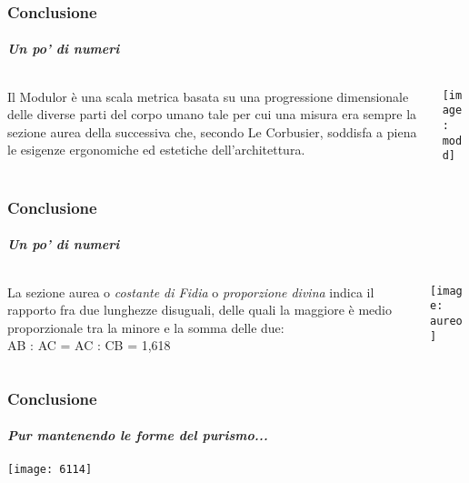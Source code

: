 \documentclass{beamer}
\begin{document}
\begin{frame}     

\frametitle{Conclusione}
\framesubtitle{\textit{Un po' di numeri}}

\begin{columns}
\begin{column}{0.4\textwidth}

Il Modulor è una scala metrica basata su una progressione dimensionale delle
diverse parti del corpo umano tale per cui una misura era sempre la sezione aurea della successiva che, secondo Le Corbusier, soddisfa a piena
le esigenze ergonomiche ed estetiche dell'architettura.

\end{column}
\begin{column}{0.3\textwidth}

\texttt{[image: modd]}

\end{column}
\end{columns}

\end{frame}

\begin{frame}     

\frametitle{Conclusione}
\framesubtitle{\textit{Un po' di numeri}}

\begin{columns}
\begin{column}{0.5\textwidth}

La sezione aurea o \emph{costante di Fidia} o \emph{proporzione divina} indica il rapporto fra due lunghezze disuguali, delle quali la maggiore è medio proporzionale tra la minore e la somma delle due: \\ AB : AC = AC : CB = 1,618 

\end{column}
\begin{column}{0.3\textwidth}

\texttt{[image: aureo]}

\end{column}
\end{columns}

\end{frame}
     
\begin{frame}     

\frametitle{Conclusione}
\framesubtitle{\textit{Pur mantenendo le forme del purismo...}}

\texttt{[image: 6114]}

\end{frame}
\end{document}
